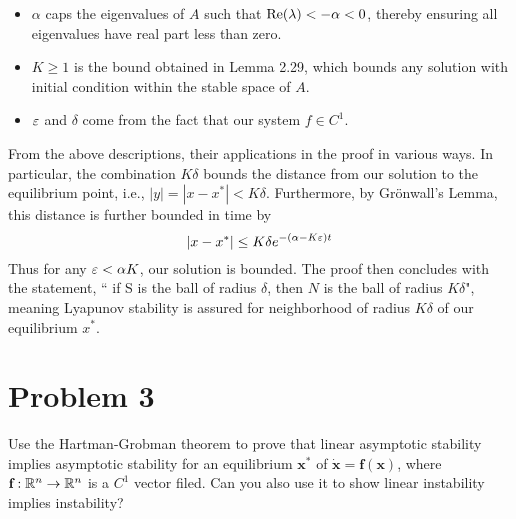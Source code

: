 \partbreak
\begin{solution}

    \begin{itemize}
        \item $\alpha$ caps the eigenvalues of $A$ such that $\Re(\lambda) < -\alpha < 0$, thereby ensuring all eigenvalues have real part less than zero.
        \item $K \geq 1$ is the bound obtained in Lemma 2.29, which bounds any solution with initial condition within the stable space of $A$. 
        \item $\varepsilon$ and $\delta$ come from the fact that our system $f \in C^1$.
    \end{itemize}

    \jump
    From the above descriptions, their applications in the proof in various ways. In particular, the combination $K\delta$ bounds the distance from our solution to the equilibrium point, i.e., $|y| = |x - x^*| < K\delta$. Furthermore, by Gr\"{o}nwall's Lemma, this distance is further bounded in time by 
    \[
    |x - x^*| \leq K\delta e^{-(\alpha - K\varepsilon)t} 
    \]
    Thus for any $\varepsilon < \alpha K$, our solution is bounded. The proof then concludes with the statement, `` if S is the ball of radius $\delta$, then $N$ is the ball of radius $K\delta$", meaning Lyapunov stability is assured for neighborhood of radius $K\delta$ of our equilibrium $x^*$. 
\end{solution}

\newpage
\section{Problem 3}
Use the Hartman-Grobman theorem to prove that linear asymptotic stability implies asymptotic stability for an equilibrium $\textbf{x}^*$ of $\dot{\textbf{x}} = \textbf{f}(\textbf{x})$, where $\textbf{f}: \mathbb{R}^n \rightarrow \mathbb{R}^n$ is a $C^1$ vector filed. Can you also use it to show linear instability implies instability?

\partbreak

